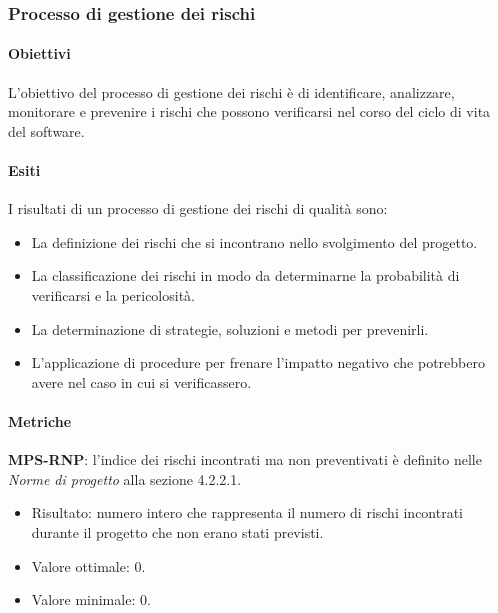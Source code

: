 \documentclass[../piano-di-qualifica.tex]{subfiles}
\begin{document}
\subsubsection{Processo di gestione dei rischi}%
\label{sub:processo_di_gestione_dei_rischi}

\paragraph{Obiettivi}%
\label{par:obiettivi_rischi}

L'obiettivo del processo di gestione dei rischi è di identificare, analizzare, monitorare e prevenire i rischi che possono verificarsi nel corso del ciclo di vita del software.

\paragraph{Esiti}%
\label{par:esiti_rischi}

I risultati di un processo di gestione dei rischi di qualità sono:
\begin{itemize}
  \item La definizione dei rischi che si incontrano nello svolgimento del progetto.
  \item La classificazione dei rischi in modo da determinarne la probabilità di verificarsi e la pericolosità.
  \item La determinazione di strategie, soluzioni e metodi per prevenirli.
  \item L'applicazione di procedure per frenare l'impatto negativo che potrebbero avere nel caso in cui si verificassero.
\end{itemize}

\paragraph{Metriche}%
\label{par:metriche_rischi}

\textbf{MPS-RNP}: l'indice dei rischi incontrati ma non preventivati è definito nelle \textit{Norme di progetto} alla sezione 4.2.2.1.
\begin{itemize}
  \item Risultato: numero intero che rappresenta il numero di rischi incontrati durante il progetto che non erano stati previsti.
  \item Valore ottimale: 0.
  \item Valore minimale: 0.
\end{itemize}
\end{document}

